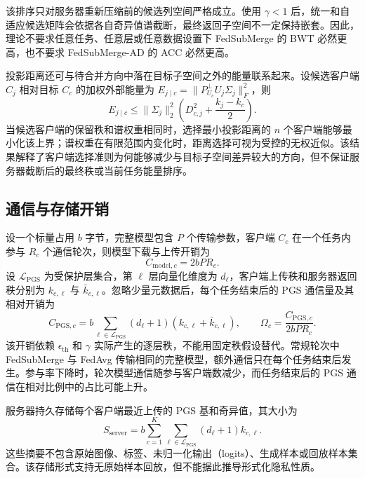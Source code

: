 该排序只对服务器重新压缩前的候选列空间严格成立。使用 $\gamma<1$ 后，统一和自适应候选矩阵会依据各自奇异值谱截断，最终返回子空间不一定保持嵌套。因此，理论不要求任意任务、任意层或任意数据设置下 FedSubMerge 的 BWT 必然更高，也不要求 FedSubMerge-AD 的 ACC 必然更高。

投影距离还可与待合并方向中落在目标子空间之外的能量联系起来。设候选客户端 $C_j$ 相对目标 $C_c$ 的加权外部能量为
$E_{j\mid c}=\|P_{U_c}^{\perp}U_j\Sigma_j\|_F^2$，则
\begin{equation}
E_{j\mid c}
\leq
\|\Sigma_j\|_2^2
\left(
D_{c,j}^2+\frac{k_j-k_c}{2}
\right).
\label{eq:fedsubmerge-peer-energy-bound}
\end{equation}
当候选客户端的保留秩和谱权重相同时，选择最小投影距离的 $n$ 个客户端能够最小化该上界；谱权重在有限范围内变化时，距离选择可视为受控的无权近似。该结果解释了客户端选择准则为何能够减少与目标子空间差异较大的方向，但不保证服务器截断后的最终秩或当前任务能量排序。

\subsection{通信与存储开销}
\label{subsec:fedsubmerge-theory-communication}

设一个标量占用 $b$ 字节，完整模型包含 $P$ 个传输参数，客户端 $C_c$ 在一个任务内参与 $R_c$ 个通信轮次，则模型下载与上传开销为
\begin{equation}
C_{\mathrm{model},c}=2bPR_c.
\label{eq:fedsubmerge-model-communication}
\end{equation}
设 $\mathcal{L}_{\mathrm{PGS}}$ 为受保护层集合，第 $\ell$ 层向量化维度为 $d_{\ell}$，客户端上传秩和服务器返回秩分别为 $k_{c,\ell}$ 与 $\bar k_{c,\ell}$。忽略少量元数据后，每个任务结束后的 PGS 通信量及其相对开销为
\begin{equation}
C_{\mathrm{PGS},c}
=
b\sum_{\ell\in\mathcal{L}_{\mathrm{PGS}}}
(d_{\ell}+1)(k_{c,\ell}+\bar k_{c,\ell}),
\qquad
\Omega_c
=
\frac{C_{\mathrm{PGS},c}}{2bPR_c}.
\label{eq:fedsubmerge-pgs-communication}
\end{equation}
该开销依赖 $\epsilon_{\mathrm{th}}$ 和 $\gamma$ 实际产生的逐层秩，不能用固定秩假设替代。常规轮次中 FedSubMerge 与 FedAvg 传输相同的完整模型，额外通信只在每个任务结束后发生。参与率下降时，轮次模型通信随参与客户端数减少，而任务结束后的 PGS 通信在相对比例中的占比可能上升。

服务器持久存储每个客户端最近上传的 PGS 基和奇异值，其大小为
\begin{equation}
S_{\mathrm{server}}
=
b\sum_{c=1}^{K}
\sum_{\ell\in\mathcal{L}_{\mathrm{PGS}}}
(d_{\ell}+1)k_{c,\ell}.
\label{eq:fedsubmerge-server-storage}
\end{equation}
这些摘要不包含原始图像、标签、未归一化输出（logits）、生成样本或回放样本集合。该存储形式支持无原始样本回放，但不能据此推导形式化隐私性质。

